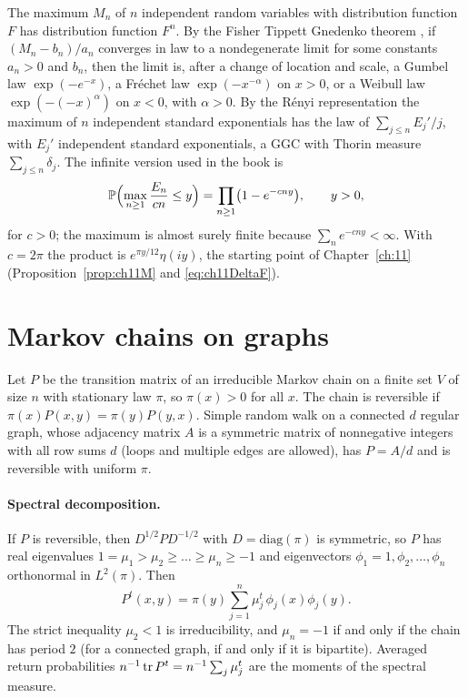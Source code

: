 The maximum $M_n$ of $n$ independent random variables with distribution function $F$ has distribution function $F^n$. By the Fisher Tippett Gnedenko theorem \cite{fishertippett1928,gnedenko1943,leadbetter1983}, if $(M_n-b_n)/a_n$ converges in law to a nondegenerate limit for some constants $a_n>0$ and $b_n$, then the limit is, after a change of location and scale, a Gumbel law $\exp(-e^{-x})$, a Fr\'echet law $\exp(-x^{-\alpha})$ on $x>0$, or a Weibull law $\exp(-(-x)^\alpha)$ on $x<0$, with $\alpha>0$. By the R\'enyi representation \cite{renyi1953} the maximum of $n$ independent standard exponentials has the law of $\sum_{j\le n}E_j'/j$, with $E_j'$ independent standard exponentials, a GGC with Thorin measure $\sum_{j\le n}\delta_j$. The infinite version used in the book is
\[
\mathbb{P}\Bigl(\max_{n\ge1}\frac{E_n}{cn}\le y\Bigr)=\prod_{n\ge1}\bigl(1-e^{-cny}\bigr),\qquad y>0,
\]
for $c>0$; the maximum is almost surely finite because $\sum_ne^{-cny}<\infty$. With $c=2\pi$ the product is $e^{\pi y/12}\eta(iy)$, the starting point of Chapter~\ref{ch:11} (Proposition~\ref{prop:ch11M} and \eqref{eq:ch11DeltaF}).

\section{Markov chains on graphs}

Let $P$ be the transition matrix of an irreducible Markov chain on a finite set $V$ of size $n$ with stationary law $\pi$, so $\pi(x)>0$ for all $x$. The chain is reversible if $\pi(x)P(x,y)=\pi(y)P(y,x)$. Simple random walk on a connected $d$ regular graph, whose adjacency matrix $A$ is a symmetric matrix of nonnegative integers with all row sums $d$ (loops and multiple edges are allowed), has $P=A/d$ and is reversible with uniform $\pi$.

\paragraph{Spectral decomposition.} If $P$ is reversible, then $D^{1/2}PD^{-1/2}$ with $D=\mathrm{diag}(\pi)$ is symmetric, so $P$ has real eigenvalues $1=\mu_1>\mu_2\ge\dots\ge\mu_n\ge-1$ and eigenvectors $\phi_1=1,\phi_2,\dots,\phi_n$ orthonormal in $L^2(\pi)$. Then
\[
P^t(x,y)=\pi(y)\sum_{j=1}^n\mu_j^t\,\phi_j(x)\phi_j(y).
\]
The strict inequality $\mu_2<1$ is irreducibility, and $\mu_n=-1$ if and only if the chain has period $2$ (for a connected graph, if and only if it is bipartite). Averaged return probabilities $n^{-1}\operatorname{tr} P^t=n^{-1}\sum_j\mu_j^t$ are the moments of the spectral measure.

